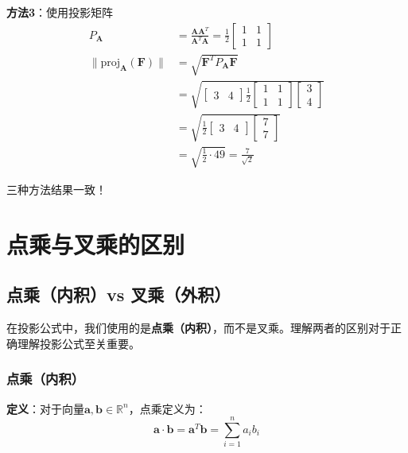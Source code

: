 \documentclass[12pt,a4paper]{article}
\begin{document}
\textbf{方法3}：使用投影矩阵
\begin{align}
P_{\bm{A}} &= \frac{\bm{A} \bm{A}^T}{\bm{A}^T \bm{A}} = \frac{1}{2} \begin{bmatrix} 1 & 1 \\ 1 & 1 \end{bmatrix} \\
\|\text{proj}_{\bm{A}}(\bm{F})\| &= \sqrt{\bm{F}^T P_{\bm{A}} \bm{F}} \\
&= \sqrt{\begin{bmatrix} 3 & 4 \end{bmatrix} \frac{1}{2} \begin{bmatrix} 1 & 1 \\ 1 & 1 \end{bmatrix} \begin{bmatrix} 3 \\ 4 \end{bmatrix}} \\
&= \sqrt{\frac{1}{2} \begin{bmatrix} 3 & 4 \end{bmatrix} \begin{bmatrix} 7 \\ 7 \end{bmatrix}} \\
&= \sqrt{\frac{1}{2} \cdot 49} = \frac{7}{\sqrt{2}}
\end{align}

三种方法结果一致！

\section{点乘与叉乘的区别}

\subsection{点乘（内积）vs 叉乘（外积）}

在投影公式中，我们使用的是\textbf{点乘（内积）}，而不是叉乘。理解两者的区别对于正确理解投影公式至关重要。

\subsubsection{点乘（内积）}

\textbf{定义}：对于向量$\bm{a}, \bm{b} \in \mathbb{R}^n$，点乘定义为：
\begin{equation}
\bm{a} \cdot \bm{b} = \bm{a}^T \bm{b} = \sum_{i=1}^n a_i b_i
\end{equation}
\end{document}
